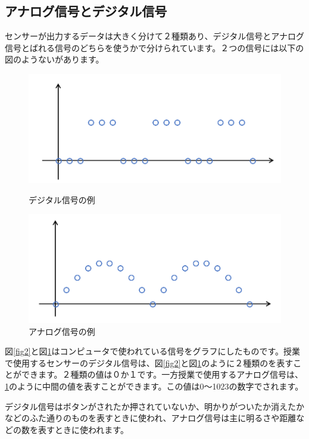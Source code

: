 \subsection{アナログ信号とデジタル信号}
センサーが出力するデータは大きく分けて２種類あり、デジタル信号とアナログ信号とばれる信号のどちらを使うかで分けられています。２つの信号には以下の図のようないがあります。
\begin{figure}[htbp]
  \begin{minipage}[b]{0.5\linewidth}
    \centering
    \includegraphics[keepaspectratio, scale=0.5]{images/chap05/text05-img002.png}
    \caption{デジタル信号の例}
    \label{fig2}
  \end{minipage}
  \begin{minipage}[b]{0.5\linewidth}
    \centering
    \includegraphics[keepaspectratio, scale=0.5]{images/chap05/text05-img003.png}
    \caption{アナログ信号の例}
    \label{fig3}
  \end{minipage}
\end{figure}

図\ref{fig2}と図\ref{fig3}はコンピュータで使われている信号をグラフにしたものです。授業で使用するセンサーのデジタル信号は、図\ref{fig2}と図\ref{fig3}のように２種類のを表すことができます。２種類の値は０か１です。一方授業で使用するアナログ信号は、\ref{fig3}のように中間の値を表すことができます。この値は0〜1023の数字でされます。

デジタル信号はボタンがされたか押されていないか、明かりがついたか消えたかなどのふた通りのものを表すときに使われ、アナログ信号は主に明るさや距離などの数を表すときに使われます。

\begin{tcolorbox}[title=\useOmetoi]
  \begin{enumerate}
\end{enumerate}
\end{tcolorbox}
